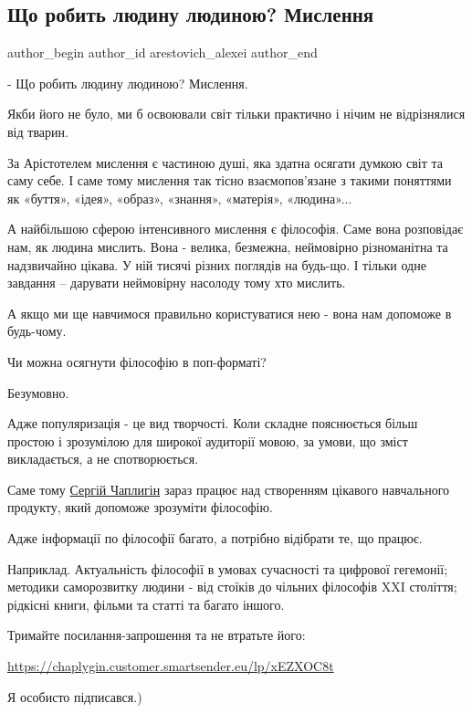  
 
 
 
 
 
\subsection{Що робить людину людиною? Мислення}
\label{sec:28_12_2021.fb.arestovich_alexei.1.myshlenie_chelovek}
 
\ifcmt
 author_begin
   author_id arestovich_alexei
 author_end
\fi

- Що робить людину людиною? Мислення. 

Якби його не було, ми б освоювали світ тільки практично і нічим не відрізнялися
від тварин.

За Арістотелем мислення є частиною душі, яка здатна осягати думкою світ та саму
себе. І саме тому мислення так тісно взаємопов'язане  з такими поняттями як
«буття», «ідея», «образ», «знання»,  «матерія», «людина»...


А найбільшою сферою  інтенсивного мислення є філософія.  Саме вона розповідає
нам, як людина мислить.  Вона - велика, безмежна, неймовірно різноманітна та
надзвичайно цікава. У ній тисячі різних поглядів на будь-що. І тільки одне
завдання – дарувати неймовірну насолоду тому хто мислить. 

А якщо ми ще навчимося правильно користуватися нею - вона нам допоможе в
будь-чому.

Чи можна осягнути філософію в поп-форматі?

Безумовно.

Адже популяризація - це вид творчості. Коли складне пояснюється більш простою і
зрозумілою для широкої аудиторії мовою, за умови, що зміст викладається, а не
спотворюється.

Саме тому \href{https://www.facebook.com/S.M.Chaplygin}{Сергій Чаплигін} зараз
працює над створенням цікавого навчального продукту, який допоможе зрозуміти
філософію. 

Адже інформації по філософії багато, а потрібно відібрати те, що працює. 

Наприклад. Актуальність філософії в умовах сучасності та цифрової гегемонії;
методики саморозвитку людини - від стоїків до чільних філософів XXI століття;
рідкісні книги, фільми та статті та багато іншого.

Тримайте посилання-запрошення та не втратьте його:

\url{https://chaplygin.customer.smartsender.eu/lp/xEZXOC8t}

Я особисто підписався.)

